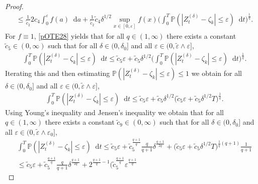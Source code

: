 \documentclass[11pt,a4paper]{article}
\numberwithin{equation}{section}
\theoremstyle{definition}
\renewcommand{\P}{{\mathbb{P}}}
\newcommand{\diff}{\mathop{}\!\mathrm{d}}
\begin{document}
\begin{proof}
\begin{equation}
\begin{aligned}
        &\leq \frac{1}{\widetilde c_2}2 c_4\int_0^{\varepsilon} f(a) \diff a
        +  \frac{1}{\widetilde c_2}  \widetilde c_4 \delta^{1/2} \sup_{x\in[0,\varepsilon]} f(x)  \Big(\int_0^T \P( |Z^{(\delta)}_{t} -\zeta_k|\leq \varepsilon) \diff t \Big)^\frac{1}{q}.
    \end{aligned}
\end{equation}
For $f\equiv 1$, \eqref{pOTE28} yields that for all $q\in(1,\infty)$ there exists a constant $\widetilde c_5\in(0,\infty)$ such that for all $\delta\in(0,\delta_0]$ and all $\varepsilon\in(0,\widetilde \varepsilon\wedge \varepsilon]$,
\begin{equation}\label{pOTE29}
    \begin{aligned}
        &\int_0^T \P( |Z^{(\delta)}_{t} -\zeta_k|\leq \varepsilon) \diff t 
        \leq \widetilde c_5 \varepsilon
        +  \widetilde c_5  \delta^{1/2} \Big(\int_0^T \P( |Z^{(\delta)}_{t} -\zeta_k|\leq \varepsilon) \diff t \Big)^\frac{1}{q}.
    \end{aligned}
\end{equation}
Iterating this and then estimating $\P( |Z^{(\delta)}_{t} -\zeta_k|\leq \varepsilon)\leq 1$ we obtain for all $\delta\in(0,\delta_0]$ and all $\varepsilon\in(0,\widetilde \varepsilon\wedge \varepsilon]$,
\begin{equation}
    \begin{aligned}
        &\int_0^T \P( |Z^{(\delta)}_{t} -\zeta_k|\leq \varepsilon) \diff t 
        \leq \widetilde c_5 \varepsilon
        +  \widetilde c_5  \delta^{1/2} \Big(\widetilde c_5 \varepsilon
        +  \widetilde c_5  \delta^{1/2} T \Big)^\frac{1}{q}.
    \end{aligned}
\end{equation}
Using Young's inequality and Jensen's inequality we obtain that for all $q\in(1,\infty)$ there exists a constant $\widetilde c_9\in(0,\infty)$ such that for all $\delta\in(0,\delta_0]$ and all $\varepsilon\in(0,\widetilde \varepsilon\wedge \varepsilon_0]$,
\begin{equation}\label{pOTE30}
    \begin{aligned}
        &\int_0^T \P( |Z^{(\delta)}_{t} -\zeta_k|\leq \varepsilon) \diff t 
        \leq \widetilde c_5 \varepsilon
        +  \widetilde c_5^\frac{q+1}{q} \frac{q}{q+1} \delta^{\frac{q+1}{2q}} + \Big(\widetilde c_5 \varepsilon
        +  \widetilde c_5  \delta^{1/2} T \Big)^{\frac{1}{q}(q+1)} \frac{1}{q+1}\\
        &\leq \widetilde c_5 \varepsilon
        +  \widetilde c_5^\frac{q+1}{q} \frac{q}{q+1} \delta^{\frac{q+1}{2q}} + 2^{\frac{q+1}{q}-1} \Big(\widetilde c_5^{\frac{q+1}{q}} \varepsilon^{\frac{q+1}{q}}

\end{aligned}
\end{equation}
\end{proof}
\end{document}
